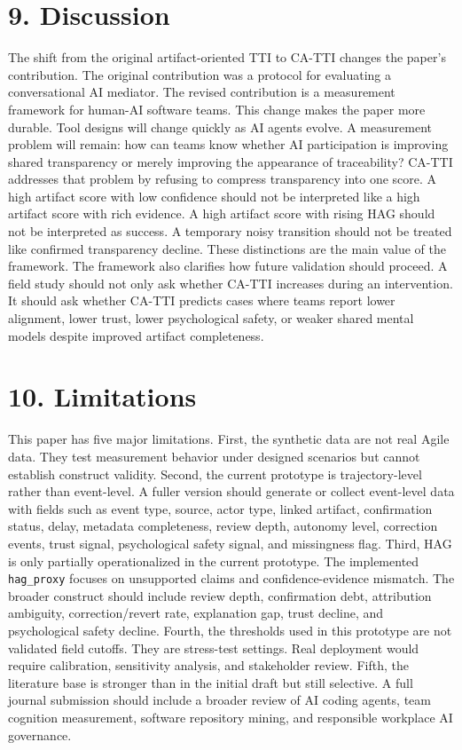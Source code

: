 \documentclass[11pt]{article}
\begin{document}
\section{9. Discussion}
The shift from the original artifact-oriented TTI to CA-TTI changes the paper's contribution. The original contribution was a protocol for evaluating a conversational AI mediator. The revised contribution is a measurement framework for human-AI software teams.
This change makes the paper more durable. Tool designs will change quickly as AI agents evolve. A measurement problem will remain: how can teams know whether AI participation is improving shared transparency or merely improving the appearance of traceability?
CA-TTI addresses that problem by refusing to compress transparency into one score. A high artifact score with low confidence should not be interpreted like a high artifact score with rich evidence. A high artifact score with rising HAG should not be interpreted as success. A temporary noisy transition should not be treated like confirmed transparency decline. These distinctions are the main value of the framework.
The framework also clarifies how future validation should proceed. A field study should not only ask whether CA-TTI increases during an intervention. It should ask whether CA-TTI predicts cases where teams report lower alignment, lower trust, lower psychological safety, or weaker shared mental models despite improved artifact completeness.
\section{10. Limitations}
This paper has five major limitations.
First, the synthetic data are not real Agile data. They test measurement behavior under designed scenarios but cannot establish construct validity.
Second, the current prototype is trajectory-level rather than event-level. A fuller version should generate or collect event-level data with fields such as event type, source, actor type, linked artifact, confirmation status, delay, metadata completeness, review depth, autonomy level, correction events, trust signal, psychological safety signal, and missingness flag.
Third, HAG is only partially operationalized in the current prototype. The implemented \texttt{hag\_proxy} focuses on unsupported claims and confidence-evidence mismatch. The broader construct should include review depth, confirmation debt, attribution ambiguity, correction/revert rate, explanation gap, trust decline, and psychological safety decline.
Fourth, the thresholds used in this prototype are not validated field cutoffs. They are stress-test settings. Real deployment would require calibration, sensitivity analysis, and stakeholder review.
Fifth, the literature base is stronger than in the initial draft but still selective. A full journal submission should include a broader review of AI coding agents, team cognition measurement, software repository mining, and responsible workplace AI governance.
\end{document}
